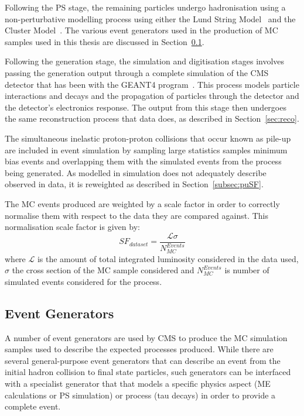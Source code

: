 Following the PS stage, the remaining particles undergo hadronisation using a non-perturbative modelling process using either the Lund String Model~\cite{Andersson:1983ia} and the Cluster Model~\cite{Winter:2003tt}.
The various event generators used in the production of MC samples used in this thesis are discussed in Section~\ref{subsec:eventGenerators}.

Following the generation stage, the simulation and digitisation stages involves passing the generation output through a complete simulation of the CMS detector that has been with the GEANT4 program~\cite{geant4,Lefebure:1999wja}.
This process models particle interactions and decays and the propagation of particles through the detector and the detector's electronics response.
The output from this stage then undergoes the same reconstruction process that data does, as described in Section~\ref{sec:reco}.

The simultaneous inelastic proton-proton collisions that occur known as pile-up are included in event simulation by sampling large statistics samples minimum bias events and overlapping them with the simulated events from the process being generated.
As \PU modelled in simulation does not adequately describe observed \PU in data, it is reweighted as described in Section~\ref{subsec:puSF}.

The MC events produced are weighted by a scale factor in order to correctly normalise them with respect to the data they are compared against.
This normalisation scale factor is given by:
\begin{equation}
SF_{dataset} = \frac{\mathcal{L} \sigma}{N_{MC}^{Events}}
\end{equation}
where $\mathcal{L}$ is the amount of total integrated luminosity considered in the data used, $\sigma$ the cross section of the MC sample considered and $N_{MC}^{Events}$ is number of simulated events considered for the process.


\subsection{Event Generators}\label{subsec:eventGenerators}
A number of event generators are used by CMS to produce the MC simulation samples used to describe the expected processes produced.
While there are several general-purpose event generators that can describe an event from the initial hadron collision to final state particles, such generators can be interfaced with a specialist generator that that models a specific physics aspect (\ie ME calculations or PS simulation) or process (\eg tau decays) in order to provide a complete event.

